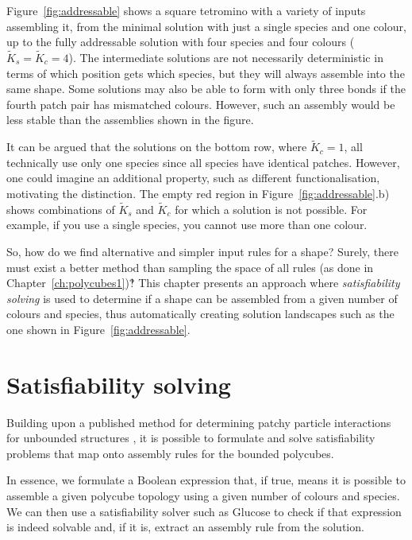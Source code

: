 Figure~\ref{fig:addressable} shows a square tetromino with a variety of inputs assembling it, from the minimal solution with just a single species and one colour, up to the fully addressable solution with four species and four colours (\(\widetilde{K}_s = \widetilde{K}_c = 4\)). The intermediate solutions are not necessarily deterministic in terms of which position gets which species, but they will always assemble into the same shape. Some solutions may also be able to form with only three bonds if the fourth patch pair has mismatched colours. However, such an assembly would be less stable than the assemblies shown in the figure. 

It can be argued that the solutions on the bottom row, where \(\widetilde{K}_c=1\), all technically use only one species since all species have identical patches. However, one could imagine an additional property, such as different functionalisation, motivating the distinction. The empty red region in Figure~\ref{fig:addressable}.b) shows combinations of \(\widetilde{K}_s\) and \(\widetilde{K}_c\) for which a solution is not possible. For example, if you use a single species, you cannot use more than one colour.



So, how do we find alternative and simpler input rules for a shape? Surely, there must exist a better method than sampling the space of all rules (as done in Chapter~\ref{ch:polycubes1})‽ This chapter presents an approach where \emph{satisfiability solving} is used to determine if a shape can be assembled from a given number of colours and species, thus automatically creating solution landscapes such as the one shown in Figure~\ref{fig:addressable}.


\section{Satisfiability solving}
\label{sec:SAT}

Building upon a published method for determining patchy particle interactions for unbounded structures \cite{romano2020designing}, it is possible to formulate and solve satisfiability problems that map onto assembly rules for the bounded polycubes.

In essence, we formulate a Boolean expression that, if true, means it is possible to assemble a given polycube topology using a given number of colours and species. We can then use a satisfiability solver such as Glucose \cite{audemard2009glucose, imms-sat18} to check if that expression is indeed solvable and, if it is, extract an assembly rule from the solution.

